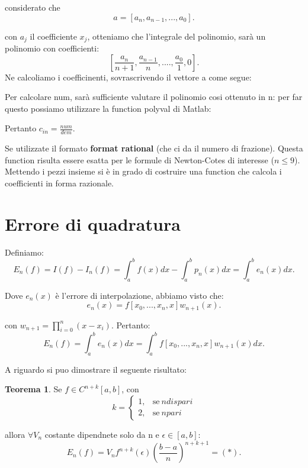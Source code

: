 \documentclass[11pt]{article}
\theoremstyle{definition}
\newtheorem{thm}{Teorema}[section] %
\theoremstyle{plain}
\begin{document}


considerato che
\[
	a=[a_n, a_{n-1}, ..., a_0]
.\] 

con $a_j$ il coefficiente $x_{j}$, otteniamo che l'integrale del polinomio, sarà un polinomio con coefficienti:
\[
	[\frac{a_n}{n+1},\frac{a_{n-1}}{n}, .... , \frac{a_0}{1}, 0]
.\] 
Ne calcoliamo i coefficinenti, sovrascrivendo il vettore a come segue:



Per calcolare num, sarà sufficiente valutare il polinomio cosi ottenuto in n:
per far questo possiamo utilizzare la function polyval di Matlab:


Pertanto $c_{in}=\frac{num}{dem}$.

Se utilizzate il formato \textbf{format rational} (che ci da il numero di frazione). Questa function risulta essere esatta per le formule di Newton-Cotes di interesse ($n\le 9$). Mettendo i pezzi insieme si è in grado di costruire una function che calcola i coefficienti in forma razionale.

\section{Errore di quadratura}
Definiamo:
\[
	E_{n}(f)=I(f)-I_{n}(f)= \int_{a}^{b}f(x)dx-\int_{a}^{b}p_n(x)dx=\int_{a}^{b}e_n(x)dx
.\] 

Dove $e_n(x)$ è l'errore di interpolazione, abbiamo visto che:
\[
	e_n(x)=f[x_0,...,x_n,x]w_{n+1}(x)
.\] 

con $w_{n+1}=\prod_{i=0}^{n} (x-x_{i})$. Pertanto:
\[
	E_n(f)=\int_{a}^{b}e_n(x)dx=\int_{a}^{b}f[x_0,...,x_n,x]w_{n+1}(x)dx
.\] 

A riguardo si puo dimostrare il seguente risultato:
\begin{thm}
	Se $f\in C^{n+k}[a,b]$, con
		  \begin{equation}
		    k=
		    \begin{cases}
		      1, & \text{se}\ n dispari \\
		      2, & \text{se}\ n pari
		    \end{cases}
		  \end{equation}
	
		  allora $\forall V_n$ costante dipendnete solo da n e $\epsilon \in [a,b]$:
		  \[
			  E_n(f)=V_nf^{n+k}(\epsilon)(\frac{b-a}{n})^{n+k+1}=(*)
		  .\] 
	
\end{thm}
\end{document}

